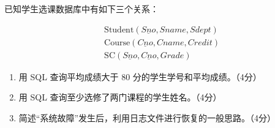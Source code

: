 \documentclass{../../note}
\begin{document}
已知学生选课数据库中有如下三个关系：

\begin{align*}
&\text{Student}(\underline{Sno}, Sname, Sdept)\\
&\text{Course}(\underline{Cno}, Cname, Credit)\\
&\text{SC}(\underline{Sno}, \underline{Cno}, Grade)
\end{align*}

\begin{enumerate}[label=(\arabic*), itemsep=0.8em]
\item 用 SQL 查询平均成绩大于 80 分的学生学号和平均成绩。（4分）
\item 用 SQL 查询至少选修了两门课程的学生姓名。（4分）
\item 简述“系统故障”发生后，利用日志文件进行恢复的一般思路。（4分）
\end{enumerate}
\end{document}
